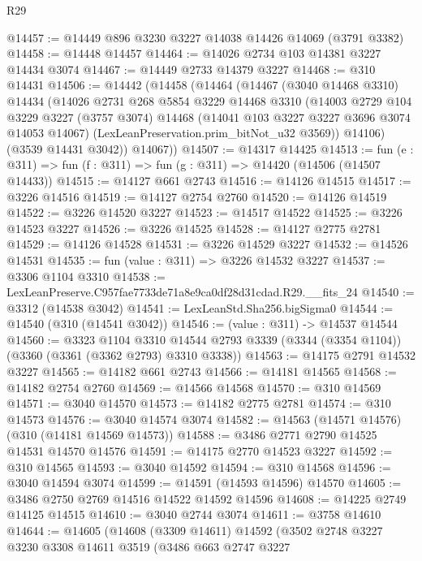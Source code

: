 \begin{lexlean}{R29}
\begin{coremodule}
@14457 := @14449 @896 @3230 @3227 @14038 @14426 @14069 (@3791 @3382)
@14458 := @14448 @14457
@14464 := @14026 @2734 @103 @14381 @3227 @14434 @3074
@14467 := @14449 @2733 @14379 @3227
@14468 := @310 @14431
@14506 := @14442
    (@14458
      (@14464
        (@14467
          (@3040 @14468 @3310)
          @14434
          (@14026
            @2731
            @268
            @5854
            @3229
            @14468
            @3310
            (@14003
              @2729
              @104
              @3229
              @3227
              (@3757 @3074)
              @14468
              (@14041 @103 @3227 @3227 @3696 @3074 @14053 @14067)
              (LexLeanPreservation.prim_bitNot_u32 @3569))
            @14106)
          (@3539 @14431 @3042))
        @14067))
@14507 := @14317 @14425
@14513 := fun (e : @311) => fun (f : @311) => fun (g : @311) => @14420 (@14506 (@14507 @14433))
@14515 := @14127 @661 @2743
@14516 := @14126 @14515
@14517 := @3226 @14516
@14519 := @14127 @2754 @2760
@14520 := @14126 @14519
@14522 := @3226 @14520 @3227
@14523 := @14517 @14522
@14525 := @3226 @14523 @3227
@14526 := @3226 @14525
@14528 := @14127 @2775 @2781
@14529 := @14126 @14528
@14531 := @3226 @14529 @3227
@14532 := @14526 @14531
@14535 := fun (value : @311) => @3226 @14532 @3227
@14537 := @3306 @1104 @3310
@14538 := LexLeanPreserve.C957fae7733de71a8e9ca0df28d31cdad.R29.__fits_24
@14540 := @3312 (@14538 @3042)
@14541 := LexLeanStd.Sha256.bigSigma0
@14544 := @14540 (@310 (@14541 @3042))
@14546 := (value : @311) -> @14537 @14544
@14560 := @3323
    @1104
    @3310
    @14544
    @2793
    @3339
    (@3344 (@3354 @1104))
    (@3360 (@3361 (@3362 @2793) @3310 @3338))
@14563 := @14175 @2791 @14532 @3227
@14565 := @14182 @661 @2743
@14566 := @14181 @14565
@14568 := @14182 @2754 @2760
@14569 := @14566 @14568
@14570 := @310 @14569
@14571 := @3040 @14570
@14573 := @14182 @2775 @2781
@14574 := @310 @14573
@14576 := @3040 @14574 @3074
@14582 := @14563 (@14571 @14576) (@310 (@14181 @14569 @14573))
@14588 := @3486 @2771 @2790 @14525 @14531 @14570 @14576
@14591 := @14175 @2770 @14523 @3227
@14592 := @310 @14565
@14593 := @3040 @14592
@14594 := @310 @14568
@14596 := @3040 @14594 @3074
@14599 := @14591 (@14593 @14596) @14570
@14605 := @3486 @2750 @2769 @14516 @14522 @14592 @14596
@14608 := @14225 @2749 @14125 @14515
@14610 := @3040 @2744 @3074
@14611 := @3758 @14610
@14644 := @14605
    (@14608
      (@3309 @14611)
      @14592
      (@3502
        @2748
        @3227
        @3230
        @3308
        @14611
        @3519
        (@3486
          @663
          @2747
          @3227

\end{coremodule}
\end{lexlean}
